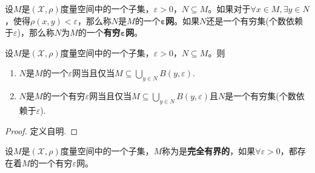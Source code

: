 \documentclass[../../main.tex]{subfiles}%
\begin{document}
\begin{definition}
设$M$是$(\mathscr{X},\rho)$度量空间中的一个子集，$\varepsilon>0$，$N\subseteq M$。如果对于$\forall x\in M,\exists y\in N$，使得$\rho(x,y)<\varepsilon$，那么称$N$是$M$的一个$\boldsymbol{\varepsilon }$\textbf{网}。如果$N$还是一个有穷集(个数依赖于$\varepsilon$)，那么称$N$为$M$的一个\textbf{有穷}$\boldsymbol{\varepsilon }$\textbf{网}。
\end{definition}

\begin{proposition}\label{proposition:泛函分析--网的等价定义}
设$M$是$(\mathscr{X},\rho)$度量空间中的一个子集，$\varepsilon>0$，$N\subseteq M$。则
\begin{enumerate}[(1)]
\item $N$是$M$的一个$\varepsilon$网当且仅当$M\subseteq\bigcup\limits_{y\in N}B(y,\varepsilon).$

\item $N$是$M$的一个有穷$\varepsilon$网当且仅当$M\subseteq\bigcup\limits_{y\in N}B(y,\varepsilon)$且$N$是一个有穷集(个数依赖于$\varepsilon$).
\end{enumerate}
\end{proposition}
\begin{proof}
定义自明.
\end{proof}

\begin{definition}
设$M$是$(\mathscr{X},\rho)$度量空间中的一个子集，$M$称为是\textbf{完全有界的}，如果$\forall\varepsilon>0$，都存在着$M$的一个有穷$\varepsilon$网。
\end{definition}
\end{document}

